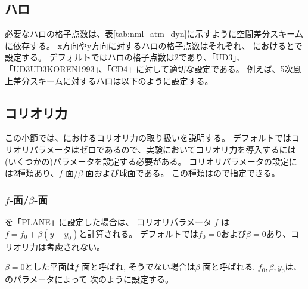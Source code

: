 \subsection{ハロ}

必要なハロの格子点数は、表\ref{tab:nml_atm_dyn}に示すように空間差分スキームに依存する。
x方向やy方向に対するハロの格子点数はそれぞれ、
におけるとで設定する。
デフォルトではハロの格子点数は2であり、「UD3」、「UD3UD3KOREN1993」、「CD4」に対して適切な設定である。
例えば、5次風上差分スキームに対するハロは以下のように設定する。


\subsection{コリオリ力} \label{subsec:coriolis}

この小節では、{\scalerm}におけるコリオリ力の取り扱いを説明する。
デフォルトではコリオリパラメータはゼロであるので、実験においてコリオリ力を導入するには
(いくつかの)パラメータを設定する必要がある。
コリオリパラメータの設定には2種類あり、$f$-面/$\beta$-面および球面である。
この種類はので指定できる。

\subsubsection{$f$-面/$\beta$-面}
を「PLANE」に設定した場合は、
コリオリパラメータ $f$ は $f=f_0 + \beta (y-y_0)$と計算される。
デフォルトでは$f_0=0$および$\beta=0$あり、コリオリ力は考慮されない。

$\beta=0$とした平面は$f$-面と呼ばれ, そうでない場合は$\beta$-面と呼ばれる.
$f_0, \beta, y_0$は、のパラメータによって
次のように設定する。

